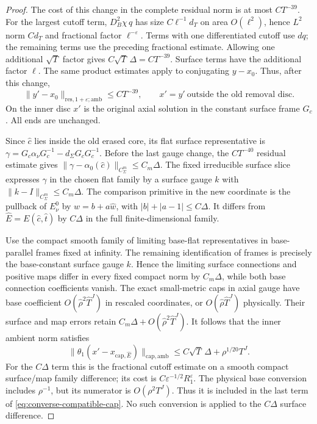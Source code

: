 \documentclass[11pt]{amsart}
\theoremstyle{definition}
\theoremstyle{remark}
\theoremstyle{plain}
\begin{document}
\begin{proof}
The cost of this change in the complete residual norm is
at most $CT^{-39}$. For the largest cutoff term,
$D_B^2\chi\,q$ has size $C\ell^{-1}d_T$ on area
$O(\ell^2)$, hence $L^2$ norm $Cd_T$ and fractional
factor $\ell^{-\varepsilon}$. Terms with one differentiated
cutoff use $dq$; the remaining terms use the preceding
fractional estimate. Allowing one additional $\sqrt T$
factor gives $C\sqrt T\,\Delta=CT^{-39}$.
Surface terms have the additional factor $\ell$.
The same product estimates apply to conjugating $y-x_0$.
Thus, after this change,
\begin{equation}\label{eq:converse-compatible-residual}
 \|y'-x_0\|_{\mathrm{res},1+\varepsilon;\mathrm{amb}}
       \leq CT^{-39},\qquad
 x'=y'\ \text{outside the old removal disc}.
\end{equation}
On the inner disc $x'$ is the original axial solution
in the constant surface frame $G_c$. All ends are unchanged.

Since $\widehat c$ lies inside the old erased core,
its flat surface representative is
$\gamma=G_c\alpha_\nu G_c^{-1}-d_\Sigma G_cG_c^{-1}$.
Before the last gauge change, the $CT^{-40}$ residual
estimate gives
$\|\gamma-\alpha_0(\widehat c)\|_{C_\Sigma^m}\leq C_m\Delta$.
The fixed irreducible surface slice expresses $\gamma$
in the chosen flat family by a surface gauge $k$ with
$\|k-I\|_{C_\Sigma^m}\leq C_m\Delta$.
The comparison primitive in the new coordinate is the pullback
of $E_\nu^0$ by
$w=b+a\widehat w$, with $|b|+|a-1|\leq C\Delta$.
It differs from $\widehat E=E(\widehat c,\widehat t)$
by $C\Delta$ in the full finite-dimensional family.

Use the compact smooth family of limiting base-flat
representatives in base-parallel frames fixed at infinity.
The remaining identification of frames is precisely the
base-constant surface gauge $k$. Hence the limiting surface
connections and positive maps differ in every fixed compact
norm by $C_m\Delta$, while both base connection coefficients
vanish. The exact small-metric caps in axial gauge have
base coefficient $O(\widehat\rho^2\widehat T^J)$ in
rescaled coordinates, or $O(\widehat\rho\widehat T^J)$
physically. Their surface and map errors retain
$C_m\Delta+O(\widehat\rho^2\widehat T^J)$.
It follows that the inner ambient norm satisfies
\begin{equation}\label{eq:converse-compatible-cap}
 \|\theta_1(x'-x_{\mathrm{cap},\widehat E})\|_{\mathrm{cap,amb}}
            \leq C\sqrt T\,\Delta+\rho^{1/20}T^J .
\end{equation}
For the $C\Delta$ term this is the fractional cutoff
estimate on a smooth compact surface/map family difference;
its cost is $C\varepsilon^{-1/2}R_1^\varepsilon$.
The physical base conversion includes $\rho^{-1}$,
but its numerator is $O(\rho^2T^J)$.
Thus it is included in the last term of
\eqref{eq:converse-compatible-cap}. No such conversion
is applied to the $C\Delta$ surface difference.


\end{proof}
\end{document}
